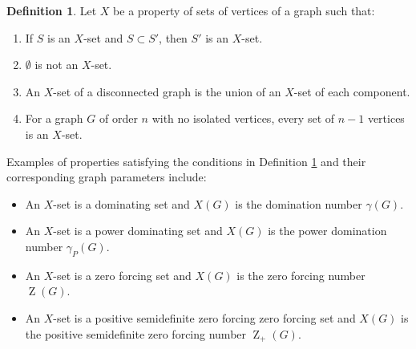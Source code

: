 \documentclass{article}
\numberwithin{figure}{section}   %
\newtheorem{obs}[thm]{Observation}
\theoremstyle{definition}
\theoremstyle{definition}
\newtheorem{defn}[thm]{Definition}
\theoremstyle{definition}
\newcommand{\ol}{\overline}
\newcommand{\bit}{\begin{itemize}}
\newcommand{\eit}{\end{itemize}}
\newcommand{\ben}{\begin{enumerate}}
\newcommand{\een}{\end{enumerate}}
\newcommand{\Z}{\operatorname{Z}}
\newcommand{\Zp}{\operatorname{Z}_+}
\newcommand{\pd}{\gamma_P}
\newcommand{\lh}[1]{{\textcolor{red}{[}\textcolor{red}{{LH: \em #1}]}}}
\newcommand{\df}[1]{{\textcolor{red}{[}\textcolor{red}{{DF: \em #1}]}}}
\begin{document}
\begin{defn}\label{d:Xprop} Let $X$ be a property  of sets of vertices of a graph such that:
\ben[(1)]
\item\label{x1} If $S$ is an $X$-set and $S\subset S'$, then $S'$ is an $X$-set.
\item\label{x2}  $\emptyset$ is not an $X$-set.
\item\label{d-c:nK1} An $X$-set of a disconnected graph is the union of an $X$-set of each component. %
\item\label{x4} For a graph $G$ of order $n$ with no isolated vertices, every set of $n-1$ vertices is an $X$-set. 
\een
\end{defn}

 Examples of properties satisfying the conditions in Definition \ref{d:Xprop} and their corresponding graph parameters include:
 
\bit
\item An $X$-set is a dominating set and $X(G)$ is the domination number $\gamma(G)$.
\item An $X$-set is a power dominating set and $X(G)$ is   the power domination number $\pd(G)$.
\item An $X$-set is a zero forcing set and $X(G)$ is  the zero forcing number $\Z(G)$.
\item An $X$-set is a positive semidefinite zero forcing zero forcing set and $X(G)$ is  the positive semidefinite zero forcing  number $\Zp(G)$.\eit


\end{document}
